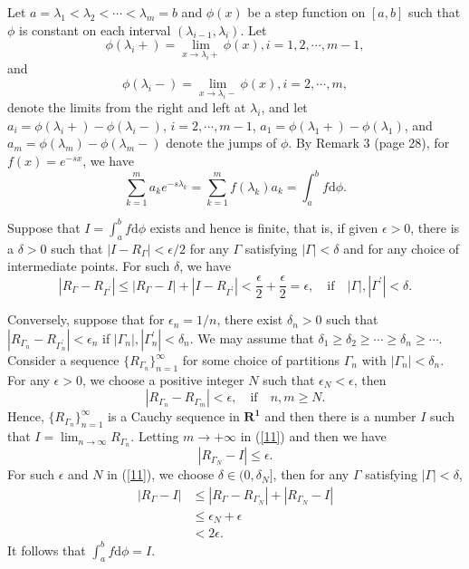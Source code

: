 \begin{exercise}{2.10}
Let $a=\lambda_1<\lambda_2<\cdots<\lambda_m=b$ and
$\phi(x)$ be a step function on $[a,b]$ such that $\phi$ is constant on each interval $(\lambda_{i-1},\lambda_i)$.
Let
$$\phi(\lambda_i+)=\lim_{x\to\lambda_i+}\phi(x),i=1,2,\cdots,m-1,$$
and
$$\phi(\lambda_i-)=\lim_{x\to\lambda_i-}\phi(x),i=2,\cdots,m,$$
denote the limits from the right and left at $\lambda_i$, and let $a_i=\phi(\lambda_{i}+)-\phi(\lambda_{i}-)$, $i=2,\cdots,m-1$, $a_1=\phi(\lambda_1+)-\phi(\lambda_1)$, and $a_m=\phi(\lambda_m)-\phi(\lambda_m-)$ denote the jumps of $\phi$. By Remark 3 (page 28), for $f(x)=e^{-sx}$, we have
$$\sum_{k=1}^ma_ke^{-s\lambda_k}=\sum_{k=1}^mf(\lambda_k)a_k=\int_a^bf\mathrm{d}\phi.$$
\end{exercise}

\begin{exercise}{2.11}
Suppose that $I=\int_a^bf\mathrm{d}\phi$ exists and hence is finite, that is, if given $\epsilon>0$, there is a $\delta>0$ such that $|I-R_{\Gamma}|<\epsilon/2$ for any $\Gamma$ satisfying $|\Gamma|<\delta$ and for any choice of intermediate points. For such $\delta$, we have
$$|R_\Gamma-R_{\Gamma^\prime}|\leq|R_\Gamma-I|+|I-R_{\Gamma^\prime}|<\frac{\epsilon}{2}+\frac{\epsilon}{2}=\epsilon,\quad \text{if}\quad |\Gamma|,|\Gamma^\prime|<\delta.$$

Conversely, suppose that for $\epsilon_n=1/n$, there exist $\delta_n>0$ such that $|R_{\Gamma_n}-R_{\Gamma^\prime_n}|<\epsilon_n$ if $|\Gamma_n|,|\Gamma^\prime_n|<\delta_n$. We may assume that $\delta_1\geq \delta_2\geq\cdots\geq\delta_n\geq\cdots$.
Consider a sequence $\{R_{\Gamma_n}\}_{n=1}^{\infty}$ for some choice of partitions $\Gamma_n$ with $|\Gamma_n|<\delta_n$.
For any $\epsilon>0$, we choose a positive integer $N$ such
that $\epsilon_N< \epsilon$, then
\begin{equation}\label{11}
|R_{\Gamma_n}-R_{\Gamma_m}|<\epsilon,\quad \text{if} \quad n,m\geq N.
\end{equation}
Hence, $\{R_{\Gamma_n}\}_{n=1}^{\infty}$ is a Cauchy sequence in $\mathbf{R^1}$ and then there is a number $I$ such that $I=\lim_{n\to\infty} R_{\Gamma_n}$.
Letting $m\to+\infty$ in (\ref{11}) and then we have
\begin{equation*}		|R_{\Gamma_N}-I|\leq\epsilon.
\end{equation*}
For such $\epsilon$ and $N$ in (\ref{11}), we choose $\delta\in(0,\delta_N]$, then for any $\Gamma$ satisfying $|\Gamma|<\delta$,
\begin{equation*}
  \begin{aligned}
    |R_{\Gamma}-I|&\leq |R_{\Gamma}-R_{\Gamma_	N}|+|R_{\Gamma_N}-I|\\
    &\leq \epsilon_N+\epsilon\\&<2\epsilon.
  \end{aligned}
\end{equation*}
It follows that $\int_a^bf\mathrm{d}\phi=I$.
\end{exercise}

